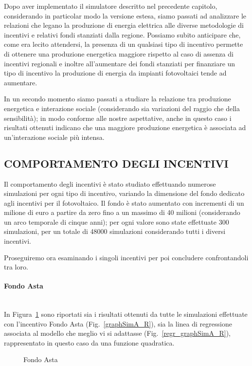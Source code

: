 \documentclass[12pt,a4paper,openright,twoside]{report}
\newcommand{\myparagraph}[1]{\paragraph{#1}\mbox{}\\}
\begin{document}
Dopo aver implementato il simulatore descritto nel precedente capitolo, considerando in particolar modo la versione estesa, siamo passati ad analizzare le relazioni che legano la produzione di energia elettrica alle diverse metodologie di incentivi e relativi fondi stanziati dalla regione. Possiamo subito anticipare che, come era lecito attendersi, la presenza di un qualsiasi tipo di incentivo permette di ottenere una produzione energetica maggiore rispetto al caso di assenza di incentivi regionali e inoltre all'aumentare dei fondi stanziati per finanziare un tipo di incentivo la produzione di energia da impianti fotovoltaici tende ad aumentare.

In un secondo momento siamo passati a studiare la relazione tra produzione energetica e interazione sociale (considerando sia variazioni del raggio che della sensibilità); in modo conforme alle nostre aspettative, anche in questo caso i risultati ottenuti indicano che una maggiore produzione energetica è associata ad un'interazione sociale più intensa.


\subsection{COMPORTAMENTO DEGLI INCENTIVI}

Il comportamento degli incentivi è stato studiato effettuando numerose simulazioni per ogni tipo di incentivo, variando la dimensione del fondo dedicato agli incentivi per il fotovoltaico. Il fondo è stato aumentato con incrementi di un milione di euro a partire da zero  fino a un massimo di 40 milioni (considerando un arco temporale di cinque anni); per ogni valore sono state effettuate 300 simulazioni, per un totale di 48000 simulazioni considerando tutti i diversi incentivi.

Proseguiremo ora esaminando i singoli incentivi per poi concludere confrontandoli tra loro.

\myparagraph{Fondo Asta}

In Figura~\ref{graphSimA} sono riportati sia i risultati ottenuti da tutte le simulazioni effettuate con l'incentivo Fondo Asta (Fig.~\ref{graphSimA_R}), sia la linea di regressione associata al modello che meglio vi si adattasse (Fig.~\ref{regr_graphSimA_R}), rappresentato in questo caso da una funzione quadratica.

\begin{figure}[H]
	\centering
	\qquad
	\caption{Fondo Asta}
	\label{graphSimA}
\end{figure}
\end{document}

